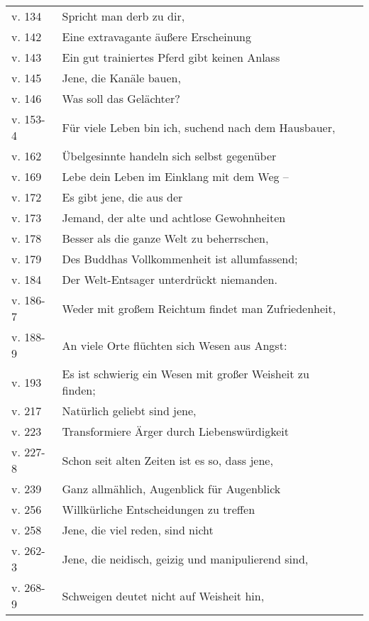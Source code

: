 {\begin{longtable}[c]{llr}
v. 134 & Spricht man derb zu dir, & \pageref{dhp-134}\\
v. 142 & Eine extravagante äußere Erscheinung & \pageref{dhp-142}\\
v. 143 & Ein gut trainiertes Pferd gibt keinen Anlass & \pageref{dhp-143}\\
v. 145 & Jene, die Kanäle bauen, & \pageref{dhp-145}\\
v. 146 & Was soll das Gelächter? & \pageref{dhp-146}\\
v. 153-4 & Für viele Leben bin ich, suchend nach dem Hausbauer, & \pageref{dhp-153}\\
v. 162 & Übelgesinnte handeln sich selbst gegenüber & \pageref{dhp-162}\\
v. 169 & Lebe dein Leben im Einklang mit dem Weg -- & \pageref{dhp-169}\\
v. 172 & Es gibt jene, die  aus der & \pageref{dhp-172}\\
v. 173 & Jemand, der alte und achtlose Gewohnheiten & \pageref{dhp-173}\\
v. 178 & Besser als die ganze Welt zu beherrschen, & \pageref{dhp-178}\\
v. 179 & Des Buddhas Vollkommenheit ist allumfassend; & \pageref{dhp-179}\\
v. 184 & Der Welt-Entsager unterdrückt niemanden. & \pageref{dhp-184}\\
v. 186-7 & Weder mit großem Reichtum findet man Zufriedenheit, & \pageref{dhp-186}\\
v. 188-9 & An viele Orte flüchten sich Wesen aus Angst: & \pageref{dhp-188}\\
v. 193 & Es ist schwierig ein Wesen mit großer Weisheit zu finden; & \pageref{dhp-193}\\
v. 217 & Natürlich geliebt sind jene, & \pageref{dhp-217}\\
v. 223 & Transformiere Ärger durch Liebenswürdigkeit & \pageref{dhp-223}\\
v. 227-8 & Schon seit alten Zeiten ist es so, dass jene, & \pageref{dhp-227}\\
v. 239 & Ganz allmählich, Augenblick für Augenblick & \pageref{dhp-239}\\
v. 256 & Willkürliche Entscheidungen zu treffen & \pageref{dhp-256}\\
v. 258 & Jene, die viel reden, sind nicht & \pageref{dhp-258}\\
v. 262-3 & Jene, die neidisch, geizig und manipulierend sind, & \pageref{dhp-262}\\
v. 268-9 & Schweigen deutet nicht auf Weisheit hin, & \pageref{dhp-268}\\

\end{longtable}}
